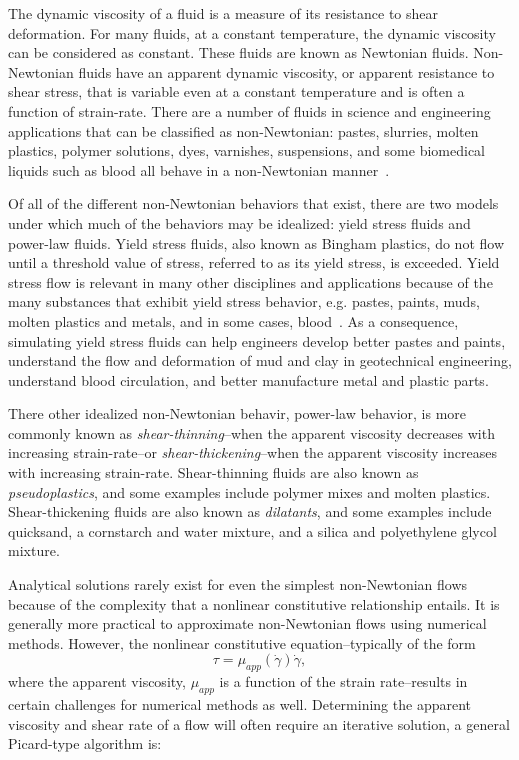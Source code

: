 \documentclass[pdftex,ms]{pittetd}
\begin{document}
The dynamic viscosity of a fluid is a measure of its resistance to shear deformation.
For many fluids, at a constant temperature, the dynamic viscosity can be considered as constant.
These fluids are known as Newtonian fluids.
Non-Newtonian fluids have an apparent dynamic viscosity, or apparent resistance to shear stress, that is variable even at a constant temperature and is often a function of strain-rate.
There are a number of fluids in science and engineering applications that can be classified as non-Newtonian: pastes, slurries, molten plastics, polymer solutions, dyes, varnishes, suspensions, and some biomedical liquids such as blood all behave in a non-Newtonian manner~\cite{bohme1987non}.

Of all of the different non-Newtonian behaviors that exist, there are two models under which much of the behaviors may be idealized: yield stress fluids and power-law fluids.
Yield stress fluids, also known as Bingham plastics, do not flow until a threshold value of stress, referred to as its yield stress, is exceeded.
Yield stress flow is relevant in many other disciplines and applications because of the many substances that exhibit yield stress behavior, e.g. pastes, paints, muds, molten plastics and metals, and in some cases, blood~\cite{wang2011lattice}. %
As a consequence, simulating yield stress fluids can help engineers develop better pastes and paints, understand the flow and deformation of mud and clay in geotechnical engineering, understand blood circulation, and better manufacture metal and plastic parts.

There other idealized non-Newtonian behavir, power-law behavior, is more commonly known as \emph{shear-thinning}--when the apparent viscosity decreases with increasing strain-rate--or \emph{shear-thickening}--when the apparent viscosity increases with increasing strain-rate. Shear-thinning fluids are also known as \emph{pseudoplastics}, and some examples include polymer mixes and molten plastics.
Shear-thickening fluids are also known as \emph{dilatants}, and some examples include quicksand, a cornstarch and water mixture, and a silica and polyethylene glycol mixture.

\label{sec:lbm-for-nnf}

Analytical solutions rarely exist for even the simplest non-Newtonian flows because of the complexity that a nonlinear constitutive relationship entails.
It is generally more practical to approximate non-Newtonian flows using numerical methods. %
However, the nonlinear constitutive equation--typically of the form \begin{equation} \label{eq:non-newtonian}
\tau = \mu_{app}(\dot{\gamma}) \dot{\gamma},
\end{equation}\noindent where the apparent viscosity, $\mu_{app}$ is a function of the strain rate--results in certain challenges for numerical methods as well.
Determining the apparent viscosity and shear rate of a flow will often require an iterative solution, a general Picard-type algorithm is:
\end{document}
